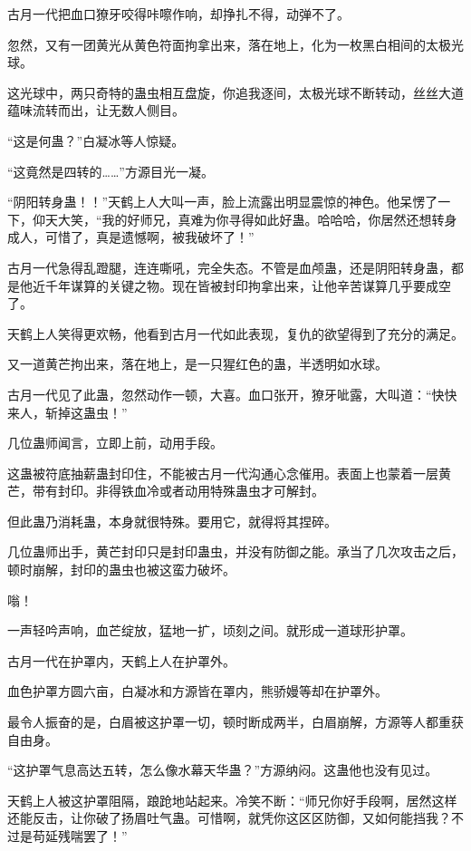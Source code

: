 
\begin{this_body}

古月一代把血口獠牙咬得咔嚓作响，却挣扎不得，动弹不了。

忽然，又有一团黄光从黄色符面拘拿出来，落在地上，化为一枚黑白相间的太极光球。

这光球中，两只奇特的蛊虫相互盘旋，你追我逐间，太极光球不断转动，丝丝大道蕴味流转而出，让无数人侧目。

“这是何蛊？”白凝冰等人惊疑。

“这竟然是四转的……”方源目光一凝。

“阴阳转身蛊！！”天鹤上人大叫一声，脸上流露出明显震惊的神色。他呆愣了一下，仰天大笑，“我的好师兄，真难为你寻得如此好蛊。哈哈哈，你居然还想转身成人，可惜了，真是遗憾啊，被我破坏了！”

古月一代急得乱蹬腿，连连嘶吼，完全失态。不管是血颅蛊，还是阴阳转身蛊，都是他近千年谋算的关键之物。现在皆被封印拘拿出来，让他辛苦谋算几乎要成空了。

天鹤上人笑得更欢畅，他看到古月一代如此表现，复仇的欲望得到了充分的满足。

又一道黄芒拘出来，落在地上，是一只猩红色的蛊，半透明如水球。

古月一代见了此蛊，忽然动作一顿，大喜。血口张开，獠牙呲露，大叫道：“快快来人，斩掉这蛊虫！”

几位蛊师闻言，立即上前，动用手段。

这蛊被符底抽薪蛊封印住，不能被古月一代沟通心念催用。表面上也蒙着一层黄芒，带有封印。非得铁血冷或者动用特殊蛊虫才可解封。

但此蛊乃消耗蛊，本身就很特殊。要用它，就得将其捏碎。

几位蛊师出手，黄芒封印只是封印蛊虫，并没有防御之能。承当了几次攻击之后，顿时崩解，封印的蛊虫也被这蛮力破坏。

嗡！

一声轻吟声响，血芒绽放，猛地一扩，顷刻之间。就形成一道球形护罩。

古月一代在护罩内，天鹤上人在护罩外。

血色护罩方圆六亩，白凝冰和方源皆在罩内，熊骄嫚等却在护罩外。

最令人振奋的是，白眉被这护罩一切，顿时断成两半，白眉崩解，方源等人都重获自由身。

“这护罩气息高达五转，怎么像水幕天华蛊？”方源纳闷。这蛊他也没有见过。

天鹤上人被这护罩阻隔，踉跄地站起来。冷笑不断：“师兄你好手段啊，居然这样还能反击，让你破了扬眉吐气蛊。可惜啊，就凭你这区区防御，又如何能挡我？不过是苟延残喘罢了！”


\end{this_body}
